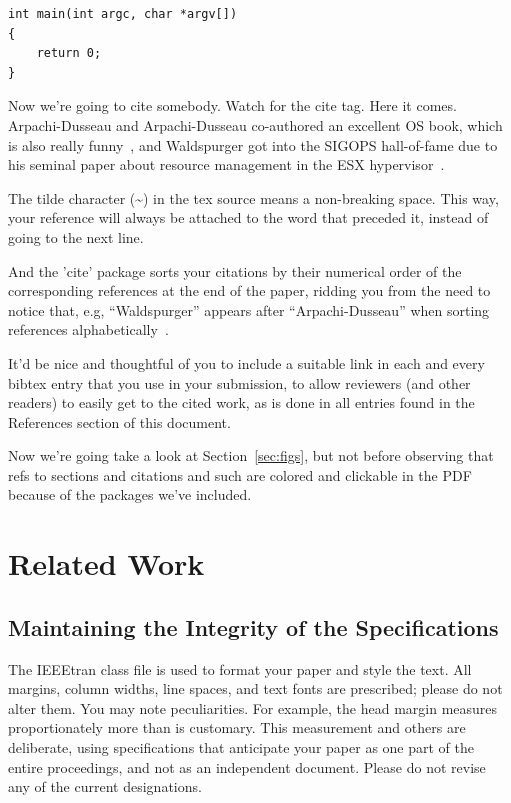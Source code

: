 \documentclass[letterpaper,twocolumn,10pt]{article}
\begin{document}
\begin{verbatim}
int main(int argc, char *argv[]) 
{
    return 0;
}
\end{verbatim}

Now we're going to cite somebody. Watch for the cite tag. Here it
comes. Arpachi-Dusseau and Arpachi-Dusseau co-authored an excellent OS
book, which is also really funny~\cite{arpachiDusseau18:osbook}, and
Waldspurger got into the SIGOPS hall-of-fame due to his seminal paper
about resource management in the ESX hypervisor~\cite{waldspurger02}.

The tilde character (\~{}) in the tex source means a non-breaking
space. This way, your reference will always be attached to the word
that preceded it, instead of going to the next line.

And the 'cite' package sorts your citations by their numerical order
of the corresponding references at the end of the paper, ridding you
from the need to notice that, e.g, ``Waldspurger'' appears after
``Arpachi-Dusseau'' when sorting references
alphabetically~\cite{waldspurger02,arpachiDusseau18:osbook}. 

It'd be nice and thoughtful of you to include a suitable link in each
and every bibtex entry that you use in your submission, to allow
reviewers (and other readers) to easily get to the cited work, as is
done in all entries found in the References section of this document.

Now we're going take a look at Section~\ref{sec:figs}, but not before
observing that refs to sections and citations and such are colored and
clickable in the PDF because of the packages we've included.

\section{Related Work}

\subsection{Maintaining the Integrity of the Specifications}

The IEEEtran class file is used to format your paper and style the text. All margins, 
column widths, line spaces, and text fonts are prescribed; please do not 
alter them. You may note peculiarities. For example, the head margin
measures proportionately more than is customary. This measurement 
and others are deliberate, using specifications that anticipate your paper 
as one part of the entire proceedings, and not as an independent document. 
Please do not revise any of the current designations.
\end{document}
